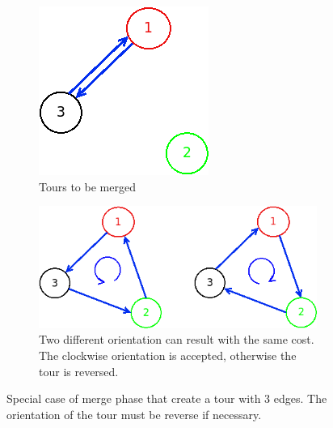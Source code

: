 \begin{figure}[!h]
	\centering
	\begin{subfigure}{.2\columnwidth}
		\includegraphics[width=\columnwidth]{img/patching_merge_clockwise1.png}
		\caption{Tours to be merged}
		\label{fig:patching_merge_clockwise1}
	\end{subfigure}
\hfill
	\begin{subfigure}{.46\columnwidth}
		\includegraphics[width=\columnwidth]{img/patching_merge_clockwise2.png}
		\caption{Two different orientation can result with the same cost. The clockwise orientation is accepted, otherwise the tour is reversed.}
		\label{fig:patching_merge_clockwise2}
	\end{subfigure}
	\caption{Special case of merge phase that create a tour with 3 edges. The orientation of the tour must be reverse if necessary.}
	\label{fig:patching_merge_clockwise}
\end{figure}
